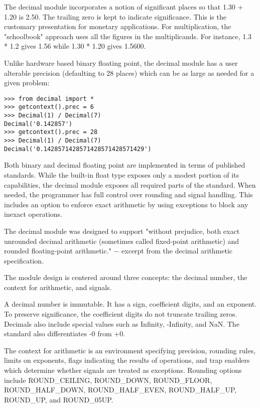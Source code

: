 \vpara
The decimal module incorporates a notion of significant places so that 1.30 + 1.20 is 2.50. The trailing zero is kept to indicate significance. This is the customary presentation for monetary applications. For multiplication, the "schoolbook" approach uses all the figures in the multiplicands. For instance, 1.3 * 1.2 gives 1.56 while 1.30 * 1.20 gives 1.5600.

\vpara
Unlike hardware based binary floating point, the decimal module has a user alterable precision (defaulting to 28 places) which can be as large as needed for a given problem:

\begin{lstlisting}
>>> from decimal import *
>>> getcontext().prec = 6
>>> Decimal(1) / Decimal(7)
Decimal('0.142857')
>>> getcontext().prec = 28
>>> Decimal(1) / Decimal(7)
Decimal('0.1428571428571428571428571429')
\end{lstlisting}


Both binary and decimal floating point are implemented in terms of published standards. While the built-in float type exposes only a modest portion of its capabilities, the decimal module exposes all required parts of the standard. When needed, the programmer has full control over rounding and signal handling. This includes an option to enforce exact arithmetic by using exceptions to block any inexact operations.

\vpara
The decimal module was designed to support "without prejudice, both exact unrounded decimal arithmetic (sometimes called fixed-point arithmetic) and rounded floating-point arithmetic." $-$ excerpt from the decimal arithmetic specification.

\vpara
The module design is centered around three concepts: the decimal number, the context for arithmetic, and signals.

\vpara
A decimal number is immutable. It has a sign, coefficient digits, and an exponent. To preserve significance, the coefficient digits do not truncate trailing zeros. Decimals also include special values such as Infinity, -Infinity, and NaN. The standard also differentiates -0 from +0.

\vpara
The context for arithmetic is an environment specifying precision, rounding rules, limits on exponents, flags indicating the results of operations, and trap enablers which determine whether signals are treated as exceptions. Rounding options include ROUND\_CEILING, ROUND\_DOWN, ROUND\_FLOOR, ROUND\_HALF\_DOWN, ROUND\_HALF\_EVEN, ROUND\_HALF\_UP, ROUND\_UP, and ROUND\_05UP.


